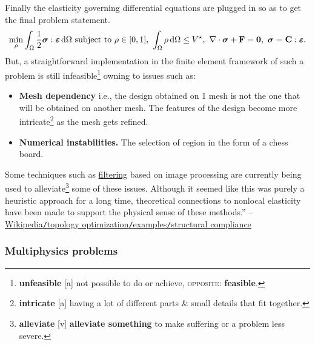 \documentclass[oneside]{book}
\numberwithin{equation}{section}
\begin{document}
Finally the elasticity governing differential equations are plugged in so as to get the final problem statement.
\begin{align*}
	\min_\rho \int_\Omega \frac{1}{2}\boldsymbol{\sigma}:\boldsymbol{\varepsilon}\,{\rm d}\Omega\mbox{ subject to }\rho\in[0,1],\ \int_\Omega \rho\,{\rm d}\Omega\le V^\star,\ \nabla\cdot\boldsymbol{\sigma} + {\bf F} = {\bf 0},\ \boldsymbol{\sigma} = {\bf C}:\boldsymbol{\varepsilon}.
\end{align*}
But, a straightforward implementation in the finite element framework of such a problem is still infeasible\footnote{\textbf{unfeasible} [a] not possible to do or achieve, \textsc{opposite}: \textbf{feasible}.} owning to issues such as:
\begin{itemize}
	\item \textbf{Mesh dependency} i.e., the design obtained on 1 mesh is not the one that will be obtained on another mesh. The features of the design become more intricate\footnote{\textbf{intricate} [a] having a lot of different parts \& small details that fit together.} as the mesh gets refined.
	\item \textbf{Numerical instabilities.} The selection of region in the form of a chess board. 
\end{itemize}
Some techniques such as \href{https://en.wikipedia.org/wiki/Kernel_(image_processing)}{filtering} based on image processing are currently being used to alleviate\footnote{\textbf{alleviate} [v] \textbf{alleviate something} to make suffering or a problem less severe.} some of these issues. Although it seemed like this was purely a heuristic approach for a long time, theoretical connections to nonlocal elasticity have been made to support the physical sense of these methods.'' -- \href{https://en.wikipedia.org/wiki/Topology_optimization#Structural_compliance}{Wikipedia\texttt{/}topology optimization\texttt{/}examples\texttt{/}structural compliance}

\subsubsection{Multiphysics problems}
\end{document}
